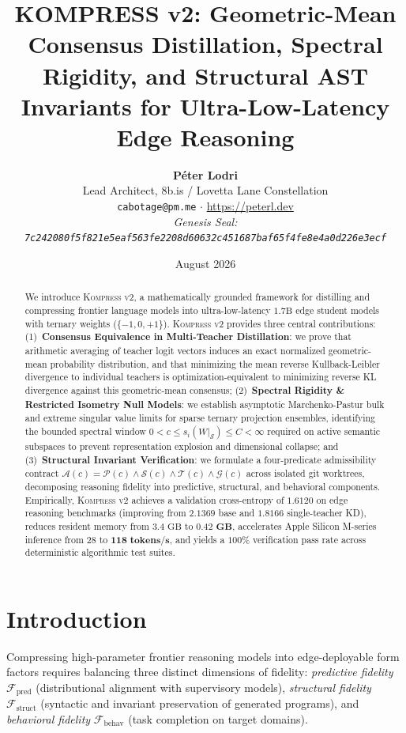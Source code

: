 \documentclass[11pt,a4paper]{article}
\title{\textbf{KOMPRESS v2: Geometric-Mean Consensus Distillation, Spectral Rigidity, and Structural AST Invariants for Ultra-Low-Latency Edge Reasoning}}
\author{
  \textbf{P\'eter Lodri} \\
  Lead Architect, 8b.is / Lovetta Lane Constellation \\
  \texttt{cabotage@pm.me} $\cdot$ \url{https://peterl.dev} \\
  \textit{Genesis Seal: \texttt{7c242080f5f821e5eaf563fe2208d60632c451687baf65f4fe8e4a0d226e3ecf}}
}
\date{August 2026}
\begin{document}
\maketitle

\begin{abstract}
We introduce \textsc{Kompress v2}, a mathematically grounded framework for distilling and compressing frontier language models into ultra-low-latency $1.7\text{B}$ edge student models with ternary weights ($\{-1, 0, +1\}$). \textsc{Kompress v2} provides three central contributions: (1)~\textbf{Consensus Equivalence in Multi-Teacher Distillation}: we prove that arithmetic averaging of teacher logit vectors induces an exact normalized geometric-mean probability distribution, and that minimizing the mean reverse Kullback-Leibler divergence to individual teachers is optimization-equivalent to minimizing reverse KL divergence against this geometric-mean consensus; (2)~\textbf{Spectral Rigidity \& Restricted Isometry Null Models}: we establish asymptotic Marchenko-Pastur bulk and extreme singular value limits for sparse ternary projection ensembles, identifying the bounded spectral window $0 < c \le s_i(W|_{\mathcal{S}}) \le C < \infty$ required on active semantic subspaces to prevent representation explosion and dimensional collapse; and (3)~\textbf{Structural Invariant Verification}: we formulate a four-predicate admissibility contract $\mathcal{A}(c) = \mathcal{P}(c) \land \mathcal{S}(c) \land \mathcal{T}(c) \land \mathcal{G}(c)$ across isolated git worktrees, decomposing reasoning fidelity into predictive, structural, and behavioral components. Empirically, \textsc{Kompress v2} achieves a validation cross-entropy of $\mathbf{1.6120}$ on edge reasoning benchmarks (improving from $2.1369$ base and $1.8166$ single-teacher KD), reduces resident memory from $3.4\text{ GB}$ to $\mathbf{0.42\text{ GB}}$, accelerates Apple Silicon M-series inference from $28$ to $\mathbf{118\text{ tokens/s}}$, and yields a $100\%$ verification pass rate across deterministic algorithmic test suites.
\end{abstract}

\section{Introduction}
Compressing high-parameter frontier reasoning models into edge-deployable form factors requires balancing three distinct dimensions of fidelity: \emph{predictive fidelity} $\mathcal{F}_{\text{pred}}$ (distributional alignment with supervisory models), \emph{structural fidelity} $\mathcal{F}_{\text{struct}}$ (syntactic and invariant preservation of generated programs), and \emph{behavioral fidelity} $\mathcal{F}_{\text{behav}}$ (task completion on target domains).
\end{document}
